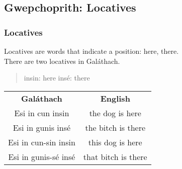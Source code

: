 \begin{table}[H]
\centering
{}
\label{solution_possessive_pronouns_plural}
\caption{Solution: possessive pronouns plural}
\end{table}

\subsection{Gwepchoprith: Locatives}
\subsubsection{Locatives}

Locatives are words that indicate a position: here, there.\\
There are two locatives in Gal\'{a}thach.
\begin{quote}
insin: here
ins\'{e}: there
\end{quote}

\begin{table}[H]
\centering
\begin{tabular}{cc}
  \toprule
  \textbf{Gal\'{a}thach} & \textbf{English}\\
  \cmidrule(lr){1-1}\cmidrule(lr){2-2}
  Esi in cun insin & the dog is here\\
  Esi in gunis ins\'{e} & the bitch is there\\
  Esi in cun-sin insin & this dog is here\\
  Esi in gunis-s\'{e} ins\'{e} & that bitch is there\\
  \bottomrule
\end{tabular}
\label{examples_locatives}
\end{table}

